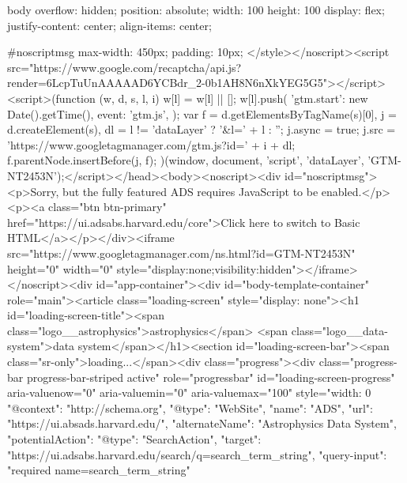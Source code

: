       body {
        overflow: hidden;
        position: absolute;
        width: 100%
        height: 100%
        display: flex;
        justify-content: center;
        align-items: center;
      }

      #noscriptmsg {
        max-width: 450px;
        padding: 10px;
      }</style></noscript><script src="https://www.google.com/recaptcha/api.js?render=6LcpTuUnAAAAAD6YCBdr_2-0b1AH8N6nXkYEG5G5"></script><script>(function (w, d, s, l, i) {
    w[l] = w[l] || [];
    w[l].push({
      'gtm.start':
        new Date().getTime(), event: 'gtm.js',
    });
    var f = d.getElementsByTagName(s)[0],
      j = d.createElement(s), dl = l != 'dataLayer' ? '&l=' + l : '';
    j.async = true;
    j.src =
      'https://www.googletagmanager.com/gtm.js?id=' + i + dl;
    f.parentNode.insertBefore(j, f);
  })(window, document, 'script', 'dataLayer', 'GTM-NT2453N');</script></head><body><noscript><div id="noscriptmsg"><p>Sorry, but the fully featured ADS requires JavaScript to be enabled.</p><p><a class="btn btn-primary" href="https://ui.adsabs.harvard.edu/core">Click here to switch to Basic HTML</a></p></div><iframe src="https://www.googletagmanager.com/ns.html?id=GTM-NT2453N" height="0" width="0" style="display:none;visibility:hidden"></iframe></noscript><div id="app-container"><div id="body-template-container" role="main"><article class="loading-screen" style="display: none"><h1 id="loading-screen-title"><span class="logo__astrophysics">astrophysics</span> <span class="logo__data-system">data system</span></h1><section id="loading-screen-bar"><span class="sr-only">loading...</span><div class="progress"><div class="progress-bar progress-bar-striped active" role="progressbar" id="loading-screen-progress" aria-valuenow="0" aria-valuemin="0" aria-valuemax="100" style="width: 0%
    "@context": "http://schema.org",
    "@type": "WebSite",
    "name": "ADS",
    "url": "https://ui.absads.harvard.edu/",
    "alternateName": "Astrophysics Data System",
    "potentialAction": {
      "@type": "SearchAction",
      "target": "https://ui.adsabs.harvard.edu/search/q={search_term_string}",
      "query-input": "required name=search_term_string"
    }
